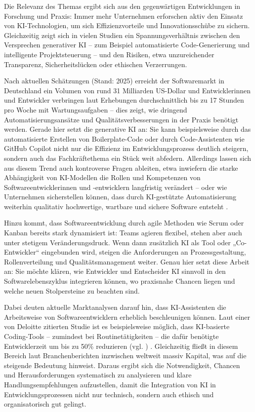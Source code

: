 Die Relevanz des Themas ergibt sich aus den gegenwärtigen Entwicklungen in
Forschung und Praxis: Immer mehr Unternehmen erforschen aktiv den Einsatz von
KI-Technologien, um sich Effizienzvorteile und Innovationsschübe zu sichern.
Gleichzeitig zeigt sich in vielen Studien ein Spannungsverhältnis zwischen den
Versprechen generativer KI – zum Beispiel automatisierte Code-Generierung und
intelligente Projektsteuerung – und den Risiken, etwa unzureichender
Transparenz, Sicherheitslücken oder ethischen Verzerrungen.

Nach aktuellen Schätzungen (Stand: 2025) erreicht der Softwaremarkt in
Deutschland ein Volumen von rund 31 Milliarden US-Dollar und Entwicklerinnen
und Entwickler verbringen laut Erhebungen durchschnittlich bis zu 17 Stunden
pro Woche mit Wartungsaufgaben – dies zeigt, wie dringend
Automatisierungsansätze und Qualitätsverbesserungen in der Praxis benötigt
werden. Gerade hier setzt die generative KI an: Sie kann beispielsweise durch
das automatisierte Erstellen von Boilerplate-Code oder durch Code-Assistenten
wie GitHub Copilot nicht nur die Effizienz im Entwicklungsprozess deutlich
steigern, sondern auch das Fachkräftethema ein Stück weit abfedern. Allerdings
lassen sich aus diesem Trend auch kontroverse Fragen ableiten, etwa inwiefern
die starke Abhängigkeit von KI-Modellen die Rollen und Kompetenzen von
Softwareentwicklerinnen und -entwicklern langfristig verändert – oder wie
Unternehmen sicherstellen können, dass durch KI-gestützte Automatisierung
weiterhin qualitativ hochwertige, wartbare und sichere Software entsteht
\cite{siebert_generative_2024}.

Hinzu kommt, dass Softwareentwicklung durch agile Methoden wie Scrum oder
Kanban bereits stark dynamisiert ist: Teams agieren flexibel, stehen aber auch
unter stetigem Veränderungsdruck. Wenn dann zusätzlich KI als Tool oder
„Co-Entwickler“ eingebunden wird, steigen die Anforderungen an
Prozessgestaltung, Rollenverteilung und Qualitätsmanagement weiter. Genau hier
setzt diese Arbeit an: Sie möchte klären, wie Entwickler und Entscheider KI
sinnvoll in den Softwarelebenszyklus integrieren können, wo praxisnahe Chancen
liegen und welche neuen Stolpersteine zu beachten sind.

Dabei deuten aktuelle Marktanalysen darauf hin, dass KI-Assistenten die
Arbeitsweise von Softwareentwicklern erheblich beschleunigen können. Laut einer
von Deloitte zitierten Studie ist es beispielsweise möglich, dass KI-basierte
Coding-Tools – zumindest bei Routinetätigkeiten – die dafür benötigte
Entwicklerzeit um bis zu 50\% reduzieren (vgl. \cite{s_future_2024}) .
Gleichzeitig fließt in diesem Bereich laut Branchenberichten inzwischen
weltweit massiv Kapital, was auf die steigende Bedeutung hinweist. Daraus
ergibt sich die Notwendigkeit, Chancen und Herausforderungen systematisch zu
analysieren und klare Handlungsempfehlungen aufzustellen, damit die Integration
von KI in Entwicklungsprozessen nicht nur technisch, sondern auch ethisch und
organisatorisch gut gelingt.